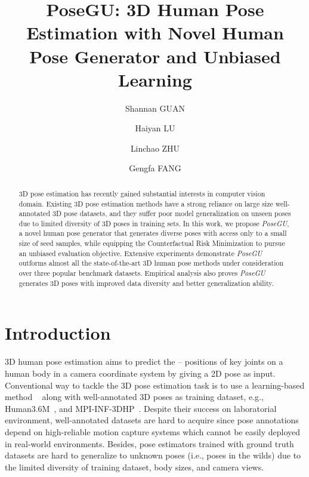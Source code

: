 \documentclass[runningheads]{llncs}
\begin{document}
\pagestyle{headings}
\mainmatter
\def\ECCVSubNumber{6684}  

\title{PoseGU: 3D Human Pose Estimation with Novel Human Pose Generator and Unbiased Learning} 



\author{Shannan GUAN \and
Haiyan LU \and
Linchao ZHU \and
Gengfa FANG}
\maketitle

\begin{abstract}
3D pose estimation has recently gained substantial interests in computer vision domain.
Existing 3D pose estimation methods have a strong reliance on large size well-annotated 3D pose datasets, and they suffer poor model generalization on unseen poses due to limited diversity of 3D poses in training sets. 
In this work, we propose \textit{PoseGU}, a novel human pose generator that generates diverse poses with access only to a small size of seed samples, while equipping the Counterfactual Risk Minimization to pursue an unbiased evaluation objective. 
Extensive experiments demonstrate \textit{PoseGU} outforms almost all the state-of-the-art 3D human pose methods under consideration over three popular benchmark datasets.
Empirical analysis also proves \textit{PoseGU} generates 3D poses with improved data diversity and better generalization ability. 

\end{abstract}

\section{Introduction}\label{intro}
3D human pose estimation aims to predict the -- positions of key joints on a human body in a camera coordinate system by giving a 2D pose as input. 
Conventional way to tackle the 3D pose estimation task is to use a learning-based method ~\cite{stgcn,posemachine,semigcn,mlp} along with  well-annotated 3D poses as training dataset, e.g., Human3.6M~\cite{H36M}, and MPI-INF-3DHP~\cite{3DHP}. 
Despite their success on laboratorial environment,
well-annotated datasets are hard to acquire since pose annotations depend on high-reliable motion capture systems which cannot be easily deployed in real-world environments. 
Besides, pose estimators trained with ground truth datasets are hard to generalize to unknown poses (i.e., poses in the wilds) due to the limited diversity of training dataset, body sizes, and camera views. 
\end{document}
